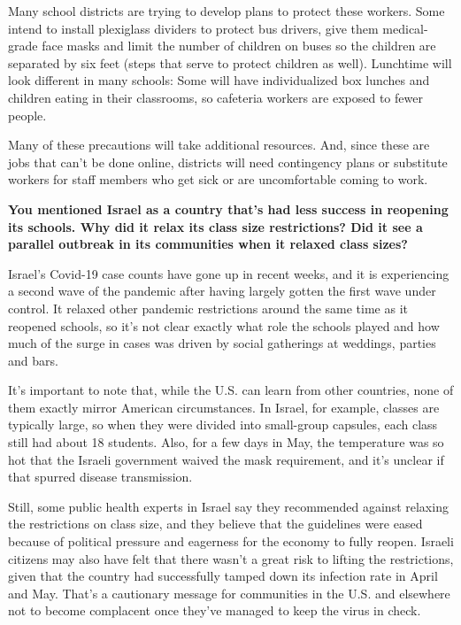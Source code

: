 Many school districts are trying to develop plans to protect these
workers. Some intend to install plexiglass dividers to protect bus
drivers, give them medical-grade face masks and limit the number of
children on buses so the children are separated by six feet (steps that
serve to protect children as well). Lunchtime will look different in
many schools: Some will have individualized box lunches and children
eating in their classrooms, so cafeteria workers are exposed to fewer
people.

Many of these precautions will take additional resources. And, since
these are jobs that can't be done online, districts will need
contingency plans or substitute workers for staff members who get sick
or are uncomfortable coming to work.

\textbf{You mentioned Israel as a country that's had less success in
reopening its schools. Why did it relax its class size restrictions? Did
it see a parallel outbreak in its communities when it relaxed class
sizes?}

Israel's Covid-19 case counts have gone up in recent weeks, and it is
experiencing a second wave of the pandemic after having largely gotten
the first wave under control. It relaxed other pandemic restrictions
around the same time as it reopened schools, so it's not clear exactly
what role the schools played and how much of the surge in cases was
driven by social gatherings at weddings, parties and bars.

It's important to note that, while the U.S. can learn from other
countries, none of them exactly mirror American circumstances. In
Israel, for example, classes are typically large, so when they were
divided into small-group capsules, each class still had about 18
students. Also, for a few days in May, the temperature was so hot that
the Israeli government waived the mask requirement, and it's unclear if
that spurred disease transmission.

Still, some public health experts in Israel say they recommended against
relaxing the restrictions on class size, and they believe that the
guidelines were eased because of political pressure and eagerness for
the economy to fully reopen. Israeli citizens may also have felt that
there wasn't a great risk to lifting the restrictions, given that the
country had successfully tamped down its infection rate in April and
May. That's a cautionary message for communities in the U.S. and
elsewhere not to become complacent once they've managed to keep the
virus in check.

